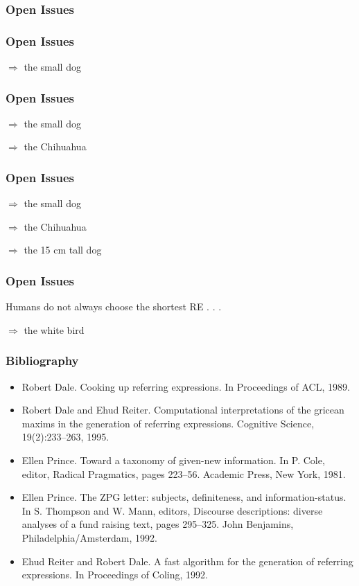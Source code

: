 \documentclass[compress,color=usenames]{beamer}
\begin{document}
\begin{frame}
\frametitle{Open Issues}

\end{frame}

\begin{frame}
\frametitle{Open Issues}

$\Rightarrow$ the small dog

\end{frame}

\begin{frame}
\frametitle{Open Issues}

$\Rightarrow$ the small dog

$\Rightarrow$ the Chihuahua

\end{frame}

\begin{frame}
\frametitle{Open Issues}

$\Rightarrow$ the small dog

$\Rightarrow$ the Chihuahua

$\Rightarrow$ the 15 cm tall dog

\end{frame}

\begin{frame}
\frametitle{Open Issues}

Humans do not always choose the shortest RE . . .

$\Rightarrow$ the white bird

\end{frame}

\begin{frame}
\frametitle{Bibliography} 

\begin{itemize}\small

\item Robert Dale.
Cooking up referring expressions.
In Proceedings of ACL, 1989.

\item Robert Dale and Ehud Reiter.
Computational interpretations of the gricean maxims in the generation of referring expressions.
Cognitive Science, 19(2):233--263, 1995.

\item Ellen Prince.
Toward a taxonomy of given-new information.
In P. Cole, editor, Radical Pragmatics, pages 223--56. Academic Press, New York, 1981.

\item Ellen Prince.
The ZPG letter: subjects, deﬁniteness, and information-status.
In S. Thompson and W. Mann, editors, Discourse descriptions: diverse analyses of a fund raising text, pages
295--325. John Benjamins, Philadelphia/Amsterdam, 1992.

\item Ehud Reiter and Robert Dale.
A fast algorithm for the generation of referring expressions.
In Proceedings of Coling, 1992.
\end{itemize}

\end{frame}
\end{document}
